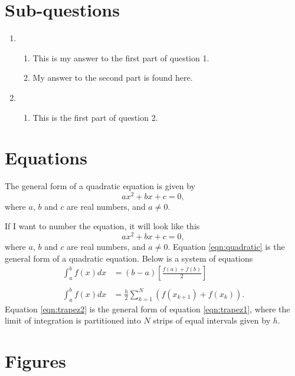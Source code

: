 \documentclass[12pt,a4paper]{article}
\begin{document}
\section{Sub-questions}
\begin{enumerate}
\item 
\begin{enumerate}
\item This is my answer to the first part of question 1.
\item My answer to the second part is found here.
\end{enumerate}
\item 
\begin{enumerate}
\item This is the first part of question 2.
\end{enumerate}
\end{enumerate}

\section{Equations}
The general form of a quadratic equation is given by $$ax^{2} + bx + c = 0,$$ where $a$, $b$ and $c$ are real numbers, and $a\neq 0$.

If I want to number the equation, it will look like this
\begin{equation}
\label{eqn:quadratic}
ax^{2} + bx + c = 0,
\end{equation}
where $a$, $b$ and $c$ are real numbers, and $a\neq 0$. Equation \eqref{eqn:quadratic} is the general form of a quadratic equation. Below is a system of equations
\begin{align}
\label{eqn:trapez1}
\int _{a}^{b}f(x)dx &= (b-a)\left[ \frac{f(a) + f(b)}{2} \right] \\
\nonumber\\
\label{eqn:trapez2}
\int _{a}^{b}f(x)dx &= \frac{h}{2}\sum _{k=1} ^{N} \left( f(x_{k+1}) + f(x_{k}) \right).
\end{align}
Equation \eqref{eqn:trapez2} is the general form of equation \eqref{eqn:trapez1}, where the limit of integration is partitioned into $N$ strips of equal intervals given by $h$.

%

\section{Figures}
\end{document}

